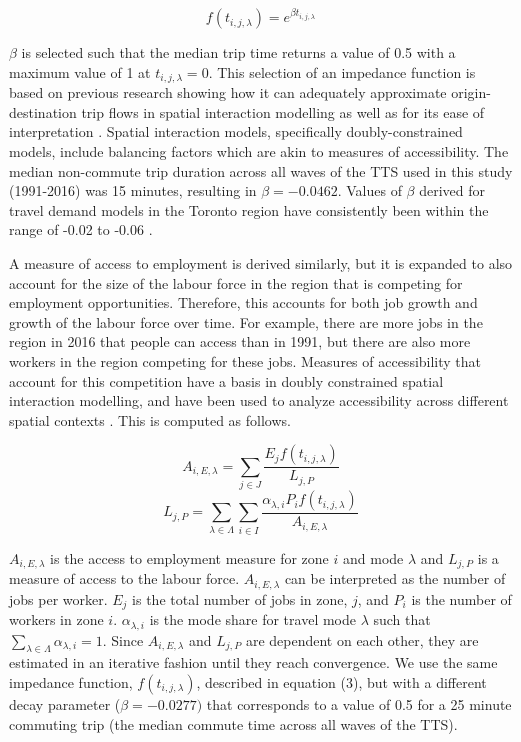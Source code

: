 \begin{equation}
f(t_{i,j,\lambda}) = e^{\beta t_{i,j,\lambda}}
\end{equation}

$\beta$ is selected such that the median trip time returns a value of 0.5 with a maximum value of 1 at $t_{i,j,\lambda} = 0$. This selection of an impedance function is based on previous research showing how it can adequately approximate origin-destination trip flows in spatial interaction modelling as well as for its ease of interpretation \cite{osth_new_2016}. Spatial interaction models, specifically doubly-constrained models, include balancing factors which are akin to measures of accessibility. The median non-commute trip duration across all waves of the TTS used in this study (1991-2016) was 15 minutes, resulting in $\beta = -0.0462$. Values of $\beta$ derived for travel demand models in the Toronto region have consistently been within the range of -0.02 to -0.06 \cite{kasraian_multi-decade_2020}.

A measure of access to employment is derived similarly, but it is expanded to also account for the size of the labour force in the region that is competing for employment opportunities. Therefore, this accounts for both job growth and growth of the labour force over time. For example, there are more jobs in the region in 2016 that people can access than in 1991, but there are also more workers in the region competing for these jobs. Measures of accessibility that account for this competition have a basis in doubly constrained spatial interaction modelling, and have been used to analyze accessibility across different spatial contexts \cite{horner_exploring_2004,allen_measure_2020}. This is computed as follows.

\begin{equation}
A_{i,E,\lambda} = \sum_{j \in J} \frac{E_{j}  f(t_{i,j, \lambda})}{L_{j,P}} 
\end{equation}
\begin{equation}
L_{j,P} = \sum_{\lambda \in \Lambda} \sum_{i \in I} \frac{\alpha_{\lambda,i} P_{i}  f(t_{i,j, \lambda})}{A_{i,E,\lambda}} 
\end{equation}

$A_{i,E,\lambda}$ is the access to employment measure for zone $i$ and mode $\lambda$ and $L_{j,P}$ is a measure of access to the labour force. $A_{i,E,\lambda}$ can be interpreted as the number of jobs per worker. $E_{j}$ is the total number of jobs in zone, $j$, and $P_i$ is the number of workers in zone $i$. $\alpha_{\lambda,i}$ is the mode share for travel mode $\lambda$ such that $\sum_{\lambda \in \Lambda} \alpha_{\lambda,i} = 1$. Since $A_{i,E,\lambda}$ and $L_{j,P}$ are dependent on each other, they are estimated in an iterative fashion until they reach convergence. We use the same impedance function, $f(t_{i,j, \lambda})$, described in equation (3), but with a different decay parameter ($\beta = -0.0277)$ that corresponds to a value of 0.5 for a 25 minute commuting trip (the median commute time across all waves of the TTS). %

